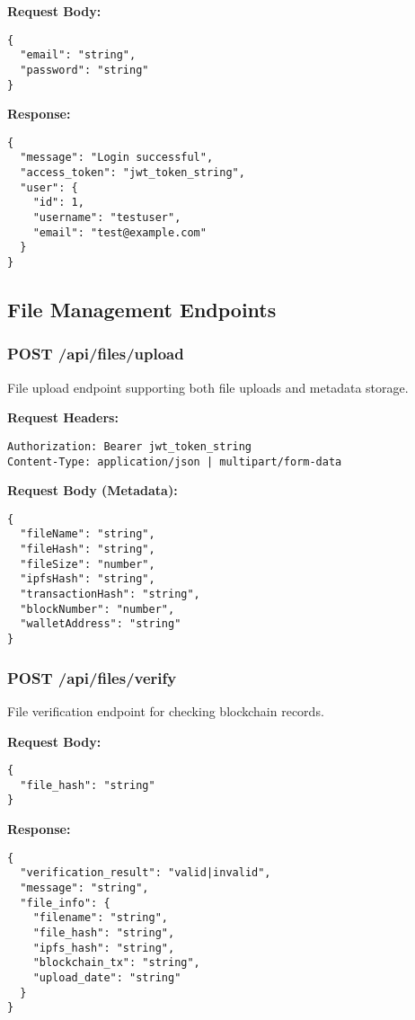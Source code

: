 \documentclass[11pt,a4paper]{article}
\begin{document}
\textbf{Request Body:}
\begin{lstlisting}[style=javascript]
{
  "email": "string",
  "password": "string"
}
\end{lstlisting}

\textbf{Response:}
\begin{lstlisting}[style=javascript]
{
  "message": "Login successful",
  "access_token": "jwt_token_string",
  "user": {
    "id": 1,
    "username": "testuser",
    "email": "test@example.com"
  }
}
\end{lstlisting}

\subsection{File Management Endpoints}

\subsubsection{POST /api/files/upload}
File upload endpoint supporting both file uploads and metadata storage.

\textbf{Request Headers:}
\begin{lstlisting}
Authorization: Bearer jwt_token_string
Content-Type: application/json | multipart/form-data
\end{lstlisting}

\textbf{Request Body (Metadata):}
\begin{lstlisting}[style=javascript]
{
  "fileName": "string",
  "fileHash": "string",
  "fileSize": "number",
  "ipfsHash": "string",
  "transactionHash": "string",
  "blockNumber": "number",
  "walletAddress": "string"
}
\end{lstlisting}

\subsubsection{POST /api/files/verify}
File verification endpoint for checking blockchain records.

\textbf{Request Body:}
\begin{lstlisting}[style=javascript]
{
  "file_hash": "string"
}
\end{lstlisting}

\textbf{Response:}
\begin{lstlisting}[style=javascript]
{
  "verification_result": "valid|invalid",
  "message": "string",
  "file_info": {
    "filename": "string",
    "file_hash": "string",
    "ipfs_hash": "string",
    "blockchain_tx": "string",
    "upload_date": "string"
  }
}
\end{lstlisting}
\end{document}
